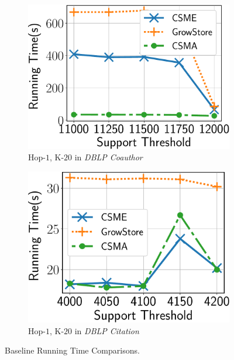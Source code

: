 \begin{figure}
\begin{subfigure}[t]{0.25\textwidth}
		\includegraphics[scale=0.24]{img2/coauthordblp/coauthordblp_h1.pdf}
		\caption{\scriptsize {\sf Hop-$1$, K-$20$} in {\em DBLP Coauthor}}
		\label{fig:coauthordblp_h1}
	\end{subfigure}%
	\begin{subfigure}[t]{0.25\textwidth}
		\includegraphics[scale=0.24]{img2/citationdblp/citationdblp_h1.pdf}
		\caption{\scriptsize {\sf Hop-$1$, K-$20$} in {\em DBLP Citation}}
		\label{fig:citationdblp_h1}
	\end{subfigure}%
	\vspace{-2mm}
	\caption{\scriptsize {\sf Baseline Running Time Comparisons}.}
	\label{fig:baseline_comp}
	\vspace{-2mm}
\end{figure}


